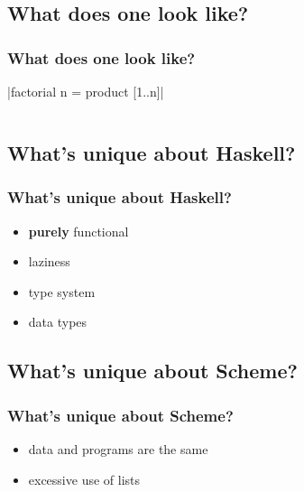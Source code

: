 \documentclass[xcolor=pdftex,dvipsnames,table]{beamer}
\begin{document}
\subsection{What does one look like?}
\begin{frame}
  \frametitle{What does one look like?}
  |factorial n = product [1..n]|
  \inputminted{scheme}{fac.scm}
\end{frame}


\subsection{What's unique about Haskell?}
\begin{frame}
  \frametitle{What's unique about Haskell?}
  \begin{itemize}
  \item \textbf{purely} functional
  \item laziness
  \item type system
  \item data types
  \end{itemize}
\end{frame}

\subsection{What's unique about Scheme?}
\begin{frame}
  \frametitle{What's unique about Scheme?}
  \begin{itemize}
  \item data and programs are the same
  \item excessive use of lists
  \end{itemize}
\end{frame}
\end{document}
